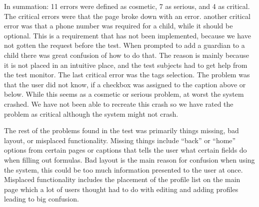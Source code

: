 In summation: 11 errors were defined as cosmetic, 7 as serious, and 4 as critical. \\

The critical errors were that the page broke down with an error. another critical error was that a phone number was required for a child, while it should be optional.
This is a requirement that has not been implemented, because we have not gotten the request before the test.
When prompted to add a guardian to a child there was great confusion of how to do that.
The reason is mainly because it is not placed in an intuitive place, and the test subjects had to get help from the test monitor.
The last critical error was the tags selection. The problem was that the user did not know, if a checkbox was assigned to the caption above or below. While this seems as a cosmetic or serious problem, at worst the system crashed. We have not been able to recreate this crash so we have rated the problem as critical although the system might not crash.

The rest of the problems found in the test was primarily things missing, bad layout, or misplaced functionality.
Missing things include ``back'' or ``home'' options from certain pages or captions that tells the user what certain fields do when filling out formulas. Bad layout is the main reason for confusion when using the system, this could be too much information presented to the user at once.
Misplaced functionality includes the placement of the profile list on the main page which a lot of users thought had to do with editing and adding profiles leading to big confusion. 